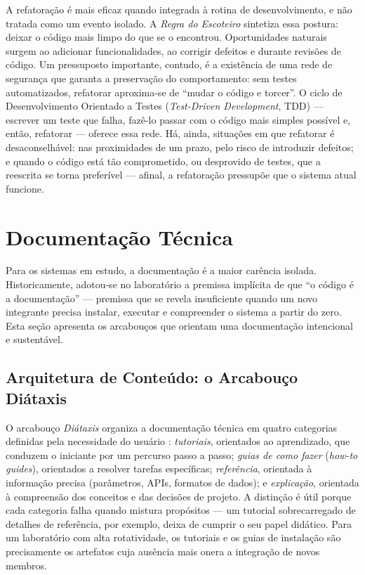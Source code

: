 A refatoração é mais eficaz quando integrada à rotina de desenvolvimento, e não tratada
como um evento isolado. A \emph{Regra do Escoteiro} sintetiza essa postura: deixar o código
mais limpo do que se o encontrou. Oportunidades naturais surgem ao adicionar
funcionalidades, ao corrigir defeitos e durante revisões de código. Um pressuposto
importante, contudo, é a existência de uma rede de segurança que garanta a preservação do
comportamento: sem testes automatizados, refatorar aproxima-se de ``mudar o código e
torcer''. O ciclo de Desenvolvimento Orientado a Testes (\emph{Test-Driven Development},
TDD) --- escrever um teste que falha, fazê-lo passar com o código mais simples possível e,
então, refatorar \cite{beck2003} --- oferece essa rede. Há, ainda, situações em que
refatorar é desaconselhável: nas proximidades de um prazo, pelo risco de introduzir
defeitos; e quando o código está tão comprometido, ou desprovido de testes, que a
reescrita se torna preferível --- afinal, a refatoração pressupõe que o sistema atual
funcione.

\section{Documentação Técnica}
\label{sec:documentacao}

Para os sistemas em estudo, a documentação é a maior carência isolada. Historicamente,
adotou-se no laboratório a premissa implícita de que ``o código é a documentação'' ---
premissa que se revela insuficiente quando um novo integrante precisa instalar, executar e
compreender o sistema a partir do zero. Esta seção apresenta os arcabouços que orientam uma
documentação intencional e sustentável.

\subsection{Arquitetura de Conteúdo: o Arcabouço Diátaxis}

O arcabouço \emph{Diátaxis} organiza a documentação técnica em quatro categorias definidas
pela necessidade do usuário \cite{diataxis}: \emph{tutoriais}, orientados ao aprendizado,
que conduzem o iniciante por um percurso passo a passo; \emph{guias de como fazer}
(\emph{how-to guides}), orientados a resolver tarefas específicas; \emph{referência},
orientada à informação precisa (parâmetros, APIs, formatos de dados); e
\emph{explicação}, orientada à compreensão dos conceitos e das decisões de projeto. A
distinção é útil porque cada categoria falha quando mistura propósitos --- um tutorial
sobrecarregado de detalhes de referência, por exemplo, deixa de cumprir o seu papel
didático. Para um laboratório com alta rotatividade, os tutoriais e os guias de instalação
são precisamente os artefatos cuja ausência mais onera a integração de novos membros.

